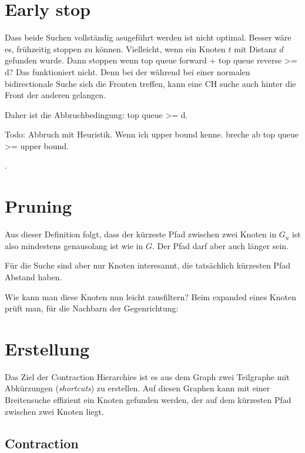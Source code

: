 \section{Early stop}

Dass beide Suchen vollständig asugeführt werden ist nicht optimal.
Besser wäre es, frühzeitig stoppen zu können.
Vielleicht, wenn ein Knoten $t$ mit Distanz $d$ gefunden wurde.
Dann stoppen wenn top queue forward + top queue reverse >= d?
Das funktioniert nicht.
Denn bei der während bei einer normalen bidirectionale Suche sich die Fronten treffen, kann eine CH suche auch hinter die Front der anderen gelangen.

Daher ist die Abbruchbedingung: top queue >= d.

Todo: Abbruch mit Heuristik. Wenn ich upper bound kenne. breche ab top queue >= upper bound.

.

\section{Pruning}


Aus dieser Definition folgt, dass der kürzeste Pfad zwischen zwei Knoten in $G_u$ ist also mindestens genausolang ist wie in $G$.
Der Pfad darf aber auch länger sein.


Für die Suche sind aber nur Knoten interesannt, die tatsächlich kürzesten Pfad Abstand haben.

Wie kann man diese Knoten nun leicht rausfiltern?
Beim expanded eines Knoten prüft man, für die Nachbarn der Gegenrichtung:


\section{Erstellung}

Das Ziel der Contraction Hierarchies ist es aus dem Graph zwei Teilgraphe mit Abkürzungen (\emph{shortcuts}) zu erstellen.
Auf diesen Graphen kann mit einer Breitensuche effizient ein Knoten gefunden werden, der auf dem kürzesten Pfad zwischen zwei Knoten liegt.

\subsection{Contraction}

